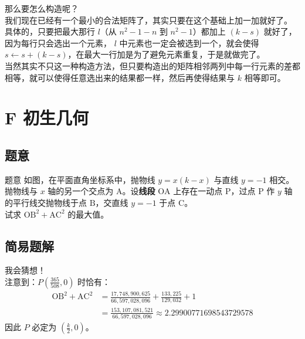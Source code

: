 \documentclass[11pt, fontset = fandol]{ctexbeamer}
\begin{document}
\begin{frame}
	\pause
	那么要怎么构造呢？\\
	\pause
	我们现在已经有一个最小的合法矩阵了，其实只要在这个基础上加一加就好了。\\
	\pause
	具体的，只要把最大那行 $l$（从 $n^2-1-n$ 到 $n^2-1$）都加上 $(k-s)$ 就好了，因为每行只会选出一个元素， $l$ 中元素也一定会被选到一个，就会使得 $s\leftarrow s+(k-s)$，在最大一行加是为了避免元素重复，于是就做完了。\\
	\pause
	当然其实不只这一种构造方法，但只要构造出的矩阵相邻两列中每一行元素的差都相等，就可以使得任意选出来的结果都一样，然后再使得结果与 $k$ 相等即可。\\
\end{frame}

\section{F 初生几何}
\subsection{题意}
\begin{frame}
  \begin{block}{题意}
    如图，在平面直角坐标系中，抛物线 $ y = x\left(k - x\right) $ 与直线 $ y = -1 $ 相交。抛物线与 $ x $ 轴的另一个交点为 $\mathrm{A}$。设\textbf{线段} $\mathrm{OA}$ 上存在一动点 $\mathrm{P}$，过点 $\mathrm{P}$ 作 $y$ 轴的平行线交抛物线于点 $\mathrm{B}$，交直线 $y = -1$ 于点 $\mathrm{C}$。\\
    试求 $\mathrm{OB}^2 + \mathrm{AC}^2$ 的最大值。
  \end{block}
\end{frame}

\subsection{简易题解}
\begin{frame}
  \pause
  我会猜想！\\
  \pause
  注意到：$P\left(\frac{365}{508}, 0\right)$ 时恰有：
  $$
  \begin{aligned}
    \mathrm{OB}^2 + \mathrm{AC}^2 &= \frac{17,748,900,625}{66,597,028,096} + \frac{133,225}{129,032} + 1\\
    &= \frac{153,107,081,521}{66,597,028,096} \approx 2.29900771698543729578
  \end{aligned}
  $$
  因此 $P$ 必定为 $(\frac{k}{2}, 0)$。\\

\end{frame}
\end{document}
